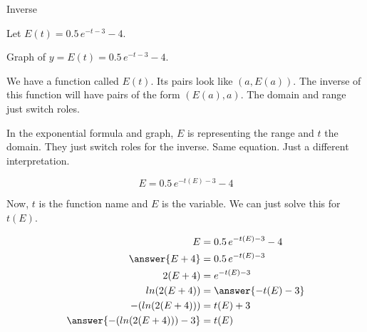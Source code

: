 \documentclass{ximera}
\begin{document}
\begin{example} Inverse

Let $E(t) = 0.5 \, e^{-t-3} - 4$.




Graph of $y = E(t) = 0.5 \, e^{-t-3} - 4$.


\begin{image}
\end{image}




We have a function called $E(t)$.  Its pairs look like $(a, E(a))$.  The inverse of this function will have pairs of the form $(E(a), a)$. The domain and range just switch roles.


In the exponential formula and graph, $E$ is representing the range and $t$ the domain.  They just switch roles for the inverse. Same equation.  Just a different interpretation.

\[    E = 0.5 \, e^{-t(E)-3} - 4   \]


Now, $t$ is the function name and $E$ is the variable.  We can just solve this for $t(E)$.

\begin{align*}
E           & = 0.5 \, e^{-t(E)-3} - 4 \\
\answer{E + 4}       & = 0.5 \, e^{-t(E)-3}  \\
2(E + 4)    & =  e^{-t(E)-3}   \\
ln(2(E+4))  & = \answer{-t(E)-3}   \\
-(ln(2(E+4)))  & = t(E)+3   \\
\answer{-(ln(2(E+4))) - 3}   & = t(E)
\end{align*}








\end{example}
\end{document}
